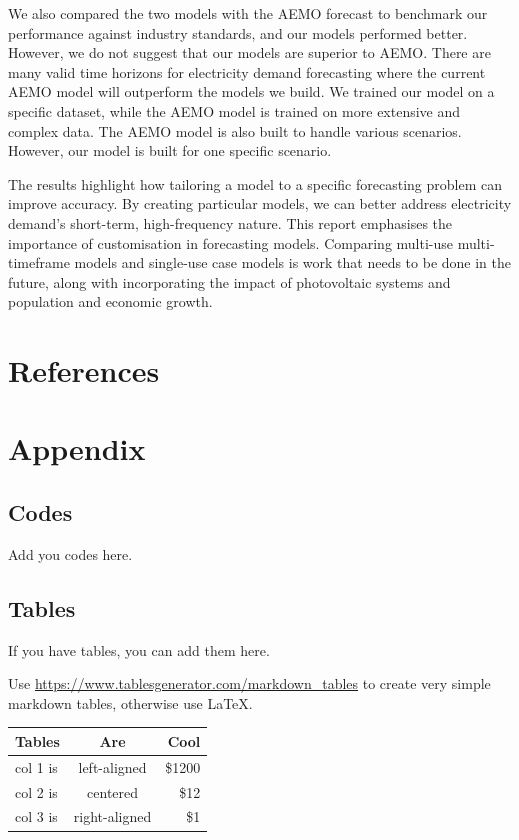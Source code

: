 \documentclass[mstat,12pt]{unswthesis}
\begin{document}
We also compared the two models with the AEMO forecast to benchmark our
performance against industry standards, and our models performed better.
However, we do not suggest that our models are superior to AEMO. There
are many valid time horizons for electricity demand forecasting where
the current AEMO model will outperform the models we build. We trained
our model on a specific dataset, while the AEMO model is trained on more
extensive and complex data. The AEMO model is also built to handle
various scenarios. However, our model is built for one specific
scenario.

The results highlight how tailoring a model to a specific forecasting
problem can improve accuracy. By creating particular models, we can
better address electricity demand's short-term, high-frequency nature.
This report emphasises the importance of customisation in forecasting
models. Comparing multi-use multi-timeframe models and single-use case
models is work that needs to be done in the future, along with
incorporating the impact of photovoltaic systems and population and
economic growth.

\chapter*{References}\label{references}

 


\chapter*{Appendix}\label{appendix}

\section*{\texorpdfstring{\textbf{Codes}}{Codes}}\label{codes}

Add you codes here.

\section*{\texorpdfstring{\textbf{Tables}}{Tables}}\label{tables}

If you have tables, you can add them here.

Use \url{https://www.tablesgenerator.com/markdown_tables} to create very
simple markdown tables, otherwise use \LaTeX.

\begin{longtable}[]{@{}lcr@{}}
\toprule\noalign{}
Tables & Are & Cool \\
\midrule\noalign{}
\endhead
\bottomrule\noalign{}
\endlastfoot
col 1 is & left-aligned & \$1200 \\
col 2 is & centered & \$12 \\
col 3 is & right-aligned & \$1 \\
\end{longtable}
\end{document}
